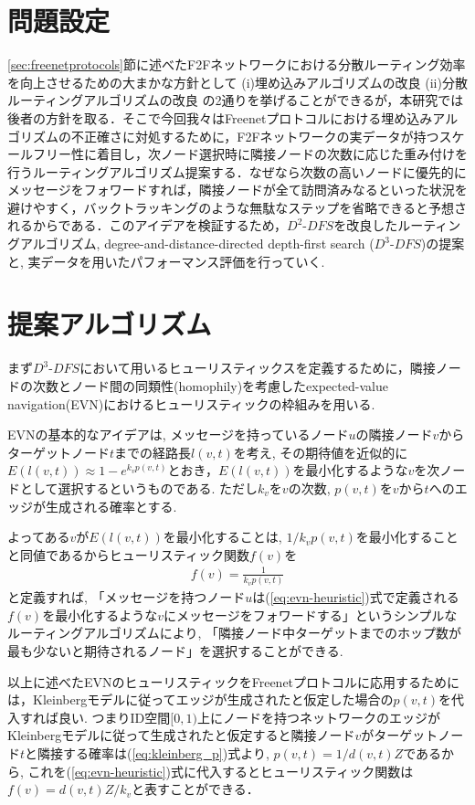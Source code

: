 \documentclass[technicalreport]{./ieicej-v3.0/UTF/ieicej}
\begin{document}
\section{問題設定}
\ref{sec:freenetprotocols}節に述べたF2Fネットワークにおける分散ルーティング効率を向上させるための大まかな方針として (i)埋め込みアルゴリズムの改良 (ii)分散ルーティングアルゴリズムの改良 の2通りを挙げることができるが，本研究では後者の方針を取る．そこで今回我々はFreenetプロトコルにおける埋め込みアルゴリズムの不正確さに対処するために，F2Fネットワークの実データが持つスケールフリー性に着目し，次ノード選択時に隣接ノードの次数に応じた重み付けを行うルーティングアルゴリズム提案する．なぜなら次数の高いノードに優先的にメッセージをフォワードすれば，隣接ノードが全て訪問済みなるといった状況を避けやすく，バックトラッキングのような無駄なステップを省略できると予想されるからである．このアイデアを検証するため，$D^2$-$DFS$を改良したルーティングアルゴリズム, degree-and-distance-directed depth-first search ($D^3$-$DFS$)の提案と, 実データを用いたパフォーマンス評価を行っていく.

\section{提案アルゴリズム}
まず$D^3$-$DFS$において用いるヒューリスティックスを定義するために，隣接ノードの次数とノード間の同類性(homophily)を考慮したexpected-value navigation(EVN)\cite{simsek2008navigating}におけるヒューリスティックの枠組みを用いる.

   EVNの基本的なアイデアは, メッセージを持っているノード$u$の隣接ノード$v$からターゲットノード$t$までの経路長$l(v,t)$を考え, その期待値を近似的に$E(l(v,t)) \approx 1- e^{k_vp(v,t)}$とおき，$E(l(v,t))$を最小化するような$v$を次ノードとして選択するというものである. ただし$k_v$を$v$の次数, $p(v,t)$を$v$から$t$へのエッジが生成される確率とする.

    よってある$v$が$E(l(v,t))$を最小化することは, $1/k_vp(v,t)$を最小化することと同値であるからヒューリスティック関数$f(v)$を
    \begin{eqnarray}
     f(v) = \frac{1}{k_vp(v,t)}\label{eq:evn-heuristic}
    \end{eqnarray}
    と定義すれば, 「メッセージを持つノード$u$は(\ref{eq:evn-heuristic})式で定義される$f(v)$を最小化するような$v$にメッセージをフォワードする」というシンプルなルーティングアルゴリズムにより, 「隣接ノード中ターゲットまでのホップ数が最も少ないと期待されるノード」を選択することができる.

    以上に述べたEVNのヒューリスティックをFreenetプロトコルに応用するためには，Kleinbergモデルに従ってエッジが生成されたと仮定した場合の$p(v,t)$を代入すれば良い. つまりID空間$[0,1)$上にノードを持つネットワークのエッジがKleinbergモデルに従って生成されたと仮定すると隣接ノード$v$がターゲットノード$t$と隣接する確率は(\ref{eq:kleinberg_p})式より, $p(v,t) = 1/d(v,t)Z$であるから, これを(\ref{eq:evn-heuristic})式に代入するとヒューリスティック関数は$f(v) = d(v,t)Z/k_v$と表すことができる．
\end{document}
